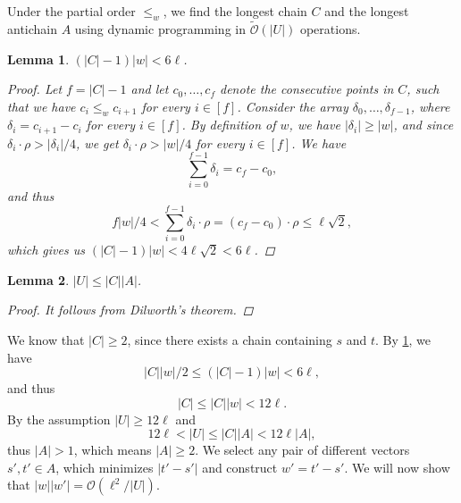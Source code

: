 \documentclass[11pt]{article}
\renewcommand{\O}{\mathcal{O}}
\newcommand{\tO}{\tilde{\mathcal{O}}}
\theoremstyle{plain}
\newtheorem{lemma}{Lemma}
\theoremstyle{definition}
\theoremstyle{remark}
\begin{document}
Under the partial order $\le_w$, we find the longest chain $C$ and the longest antichain $A$ using dynamic programming in $\tO(|U|)$ operations.

\begin{lemma}\label{C_ineq}
	$(|C| - 1) |w| < 6\ell$. 
	\begin{proof}
		Let $f = |C| - 1$ and
		let $c_0, \dots, c_{f}$ denote the consecutive points in $C$, such that we have $c_i \le_w c_{i + 1}$ for every $i \in [f]$.
		Consider the array $\delta_0, \dots, \delta_{f - 1}$, where $\delta_i = c_{i + 1} - c_i$ for every $i \in [f]$.
		By definition of $w$, we have $|\delta_i| \ge |w|$,
		and since $\delta_i \cdot \rho > |\delta_i| / 4$, we get
		$\delta_i \cdot \rho > |w| / 4$ for every $i \in [f]$.
		We have
		\[ \sum_{i = 0}^{f - 1} \delta_i = c_f - c_0,\]
		and thus
		\[ f|w| / 4 < \sum_{i = 0}^{f - 1} \delta_i \cdot \rho = (c_f - c_0) \cdot \rho \le \ell \sqrt{2}, \]
		which gives us $(|C| - 1)|w| < 4\ell \sqrt{2} < 6\ell$.
	\end{proof}
\end{lemma}

\begin{lemma}\label{dilworth}
	$|U| \le |C| |A|$.
	\begin{proof}
		It follows from Dilworth's theorem.
	\end{proof}
\end{lemma}

We know that $|C| \ge 2$, since there exists a chain containing $s$ and $t$.
By \cref{C_ineq}, we have
\[ |C||w| / 2 \le (|C| - 1)|w| < 6\ell, \]
and thus
\[ |C| \le |C||w| < 12\ell. \]
By the assumption $|U| \ge 12\ell$ and 
\[12 \ell < |U| \le |C| |A| < 12\ell|A|,\]
thus $|A| > 1$, which means $|A| \ge 2$.
We select any pair of different vectors $s', t' \in A$, which minimizes $|t' - s'|$ and construct $w' = t' - s'$.
We will now show that $|w||w'| = \O(\ell^2 / |U|)$.
\end{document}
